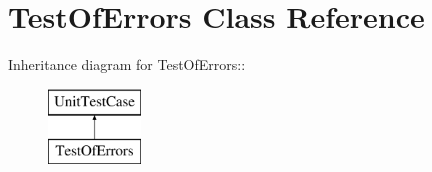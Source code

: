 \hypertarget{class_test_of_errors}{
\section{TestOfErrors Class Reference}
\label{class_test_of_errors}
}
Inheritance diagram for TestOfErrors::\begin{figure}[H]
\begin{center}
\leavevmode
\includegraphics[height=2cm]{class_test_of_errors}
\end{center}
\end{figure}
